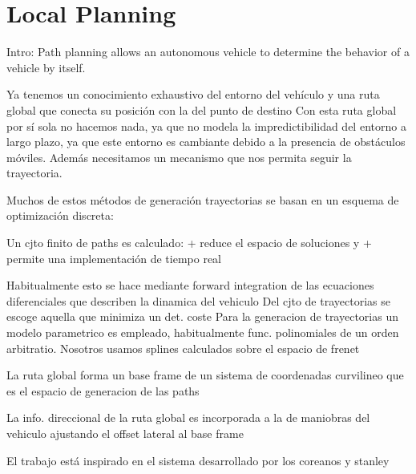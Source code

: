 
\graphicspath{{./images/chapter07/bmps/}{./images/chapter07/vects/}{./images/chapter07/}}

\chapter{Local Planning}\label{ch:chapter07}

Intro:
Path planning allows an autonomous vehicle to determine the behavior of a vehicle by itself.

Ya tenemos un conocimiento exhaustivo del entorno del vehículo y una ruta global que conecta su posición con la del punto de destino
Con esta ruta global por sí sola no hacemos nada, ya que no modela la impredictibilidad del entorno a largo plazo, ya que este entorno es cambiante debido a la presencia de obstáculos móviles.
Además necesitamos un mecanismo que nos permita seguir la trayectoria.

Muchos de estos métodos de generación trayectorias se basan en un esquema de optimización discreta:

Un cjto finito de paths es calculado:
+ reduce el espacio de soluciones y
+ permite una implementación de tiempo real 


Habitualmente esto se hace mediante forward integration de las ecuaciones diferenciales que describen la dinamica del vehiculo
Del cjto de trayectorias se escoge aquella que minimiza un det. coste
Para la generacion de trayectorias un modelo parametrico es empleado, habitualmente func. polinomiales de un orden arbitratio. 
Nosotros usamos splines calculados sobre el espacio de frenet


La ruta global forma un base frame de un sistema de coordenadas curvilineo que es el espacio de generacion de las paths

La info. direccional de la ruta global es incorporada a la de maniobras del vehiculo ajustando el offset lateral al base frame

El trabajo está inspirado en el sistema desarrollado por los coreanos y stanley

